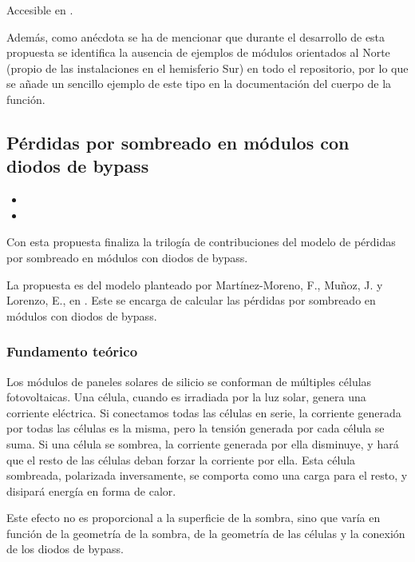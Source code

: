 Accesible en .

Además, como anécdota se ha de mencionar que durante el desarrollo de esta propuesta se identifica la ausencia de ejemplos de módulos orientados al Norte (propio de las instalaciones en el hemisferio Sur) en todo el repositorio, por lo que se añade un sencillo ejemplo de este tipo en la documentación del cuerpo de la función.

\subsection{Pérdidas por sombreado en módulos con diodos de bypass} \label{sct:desarrollo:contribuciones_cientificas:perdidas_sombreado}

\begin{itemize}
    \item {}
    \item {}
\end{itemize}

Con esta propuesta finaliza la trilogía de contribuciones del \gls{modelo} de pérdidas por sombreado en módulos con \gls{diodos de bypass}.

La propuesta es del modelo planteado por Martínez-Moreno, F., Muñoz, J. y Lorenzo, E., en \cite{Martínez-Moreno_Muñoz_Lorenzo_2010}. Este se encarga de calcular las pérdidas por sombreado en módulos con \gls{diodos de bypass}.

\subsubsection{Fundamento teórico}

Los módulos de paneles solares de silicio se conforman de múltiples células fotovoltaicas. Una célula, cuando es irradiada por la luz solar, genera una corriente eléctrica. Si conectamos todas las células en serie, la corriente generada por todas las células es la misma, pero la tensión generada por cada célula se suma. Si una célula se sombrea, la corriente generada por ella disminuye, y hará que el resto de las células deban forzar la corriente por ella. Esta célula sombreada, polarizada inversamente, se comporta como una \gls{carga} para el resto, y disipará energía en forma de calor.

Este efecto no es proporcional a la superficie de la \gls{sombra}, sino que varía en función de la geometría de la \gls{sombra}, de la geometría de las células y la conexión de los \gls{diodos de bypass}.

